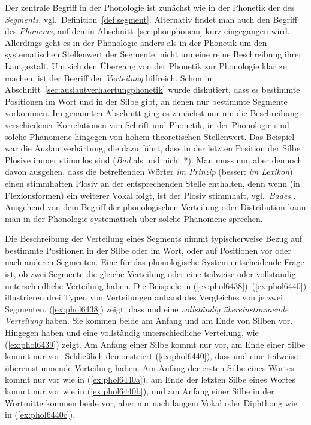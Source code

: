 Der zentrale Begriff in der Phonologie ist zunächst wie in der Phonetik der des \textit{Segments}, vgl.\ Definition~\ref{def:segment}.
Alternativ findet man auch den Begriff des \textit{Phonems}, auf den in Abschnitt~\ref{sec:phonphonem} kurz eingegangen wird.
Allerdings geht es in der Phonologie anders als in der Phonetik um den systematischen Stellenwert der Segmente, nicht um eine reine Beschreibung ihrer Lautgestalt.
Um sich den Übergang von der Phonetik zur Phonologie klar zu machen, ist der Begriff der \textit{Verteilung} hilfreich.
Schon in Abschnitt~\ref{sec:auslautverhaertungphonetik} wurde diskutiert, dass es bestimmte Positionen im Wort und in der Silbe gibt, an denen nur bestimmte Segmente vorkommen.
Im genannten Abschnitt ging es zunächst nur um die Beschreibung verschiedener Korrelationen von Schrift und Phonetik, in der Phonologie sind solche Phänomene hingegen von hohem theoretischen Stellenwert.
Das Beispiel war die Auslautverhärtung, die dazu führt, dass in der letzten Position der Silbe Plosive immer stimmlos sind (\textit{Bad} als \textipa{[ba:t]} und nicht *\textipa{[ba:d]}).
Man muss nun aber dennoch davon ausgehen, dass die betreffenden Wörter \textit{im Prinzip} (besser: \textit{im Lexikon}) einen stimmhaften Plosiv an der entsprechenden Stelle enthalten, denn wenn (\zB in Flexionsformen) ein weiterer Vokal folgt, ist der Plosiv stimmhaft, vgl.\ \textit{Bades} .
Ausgehend von dem Begriff der phonologischen Verteilung oder Distribution kann man in der Phonologie systematisch über solche Phänomene sprechen.


Die Beschreibung der Verteilung eines Segments nimmt typischerweise Bezug auf bestimmte Positionen in der Silbe oder im Wort, oder auf Positionen vor oder nach anderen Segmenten.
Eine für das phonologische System entscheidende Frage ist, ob zwei Segmente die gleiche Verteilung oder eine teilweise oder vollständig unterschiedliche Verteilung haben.
Die Beispiele in (\ref{ex:phol6438})--(\ref{ex:phol6440}) illustrieren drei Typen von Verteilungen anhand des Vergleiches von je zwei Segmenten.
(\ref{ex:phol6438}) zeigt, dass \textipa{[t]} und \textipa{[k]} eine \textit{vollständig übereinstimmende Verteilung} haben.
Sie kommen beide am Anfang und am Ende von Silben vor.
Hingegen haben \textipa{[h]} und \textipa{[N]} eine vollständig unterschiedliche  Verteilung, wie (\ref{ex:phol6439}) zeigt.
Am Anfang einer Silbe kommt nur \textipa{[h]} vor, am Ende einer Silbe kommt nur \textipa{[N]} vor.
Schließlich demonstriert (\ref{ex:phol6440}), dass \textipa{[s]} und \textipa{[z]} eine teilweise übereinstimmende Verteilung haben.
Am Anfang der ersten Silbe eines Wortes kommt nur \textipa{[z]} vor wie in (\ref{ex:phol6440a}), am Ende der letzten Silbe eines Wortes kommt nur \textipa{[s]} vor wie in (\ref{ex:phol6440b}), und am Anfang einer Silbe in der Wortmitte kommen beide vor, \textipa{[z]} aber nur nach langem Vokal oder Diphthong wie in (\ref{ex:phol6440c}).

